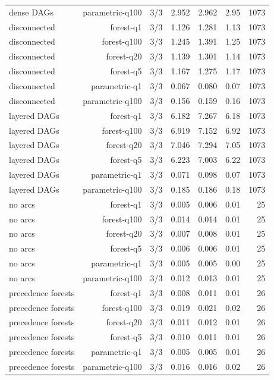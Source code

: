{\begin{longtable}{lrrrrrr}
dense DAGs & parametric-q100 & 3/3 & 2.952 & 2.962 & 2.95 & 1073 \\
disconnected & forest-q1 & 3/3 & 1.126 & 1.281 & 1.13 & 1073 \\
disconnected & forest-q100 & 3/3 & 1.245 & 1.391 & 1.25 & 1073 \\
disconnected & forest-q20 & 3/3 & 1.139 & 1.301 & 1.14 & 1073 \\
disconnected & forest-q5 & 3/3 & 1.167 & 1.275 & 1.17 & 1073 \\
disconnected & parametric-q1 & 3/3 & 0.067 & 0.080 & 0.07 & 1073 \\
disconnected & parametric-q100 & 3/3 & 0.156 & 0.159 & 0.16 & 1073 \\
layered DAGs & forest-q1 & 3/3 & 6.182 & 7.267 & 6.18 & 1073 \\
layered DAGs & forest-q100 & 3/3 & 6.919 & 7.152 & 6.92 & 1073 \\
layered DAGs & forest-q20 & 3/3 & 7.046 & 7.294 & 7.05 & 1073 \\
layered DAGs & forest-q5 & 3/3 & 6.223 & 7.003 & 6.22 & 1073 \\
layered DAGs & parametric-q1 & 3/3 & 0.071 & 0.098 & 0.07 & 1073 \\
layered DAGs & parametric-q100 & 3/3 & 0.185 & 0.186 & 0.18 & 1073 \\
no arcs & forest-q1 & 3/3 & 0.005 & 0.006 & 0.01 & 25 \\
no arcs & forest-q100 & 3/3 & 0.014 & 0.014 & 0.01 & 25 \\
no arcs & forest-q20 & 3/3 & 0.007 & 0.008 & 0.01 & 25 \\
no arcs & forest-q5 & 3/3 & 0.006 & 0.006 & 0.01 & 25 \\
no arcs & parametric-q1 & 3/3 & 0.005 & 0.005 & 0.00 & 25 \\
no arcs & parametric-q100 & 3/3 & 0.012 & 0.013 & 0.01 & 25 \\
precedence forests & forest-q1 & 3/3 & 0.008 & 0.011 & 0.01 & 26 \\
precedence forests & forest-q100 & 3/3 & 0.019 & 0.021 & 0.02 & 26 \\
precedence forests & forest-q20 & 3/3 & 0.011 & 0.012 & 0.01 & 26 \\
precedence forests & forest-q5 & 3/3 & 0.010 & 0.011 & 0.01 & 26 \\
precedence forests & parametric-q1 & 3/3 & 0.005 & 0.005 & 0.01 & 26 \\
precedence forests & parametric-q100 & 3/3 & 0.016 & 0.016 & 0.02 & 26 \\

\end{longtable}}
